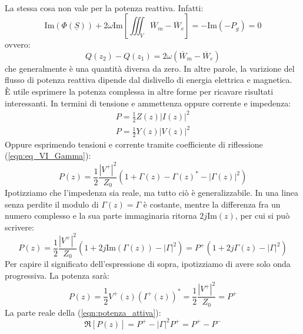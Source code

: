 \documentclass{book}
\begin{document}
        \\ La stessa cosa non vale per la potenza reattiva. Infatti:
        \begin{equation}
            \textrm{Im}(\Phi(\underline{S})) +2 \omega \textrm{Im}[\iiint_{V} \overline{W}_{m}-\overline{W}_{e}] = - \textrm{Im}(-P_{g}) = 0
        \end{equation}
        ovvero:
        \begin{equation}
            Q(z_{2})-Q(z_{1})=2 \omega (\overline{W}_{m}-\overline{W}_{e})
        \end{equation}
        che generalmente è una quantità diversa da zero. In altre parole, la varizione del flusso di potenza reattiva
        dipende dal dislivello di energia elettrica e magnetica.
        \\ 
        È utile esprimere la potenza complessa in altre forme per ricavare risultati interessanti. In termini 
        di tensione e ammettenza oppure corrente e impedenza:
        \begin{align}
            P = \frac{1}{2}Z(z)|I(z)|^{2} \\
            P= \frac{1}{2}Y(z)|V(z)|^{2}
        \end{align}
        Oppure esprimendo tensioni e corrente tramite coefficiente di riflessione (\ref{eqn:eq_VI_Gamma}):
        \begin{equation}
            P(z)=\frac{1}{2}\frac{|V^{+}|^{2}}{Z_{0}} (1+\Gamma(z)-\Gamma(z)^{*}-|\Gamma(z)|^{2})
        \end{equation}
        Ipotizziamo che l'impedenza sia reale, ma tutto ciò è generalizzabile. In una linea senza perdite il modulo di $\Gamma(z) = \Gamma$ è costante, mentre la differenza fra un numero complesso e 
        la sua parte immaginaria ritorna $2j\textrm{Im}(z)$, per cui si può scrivere:
        \begin{equation}
            \label{eqn:potenza_attiva}
            P(z)=\frac{1}{2}\frac{|V^{+}|^{2}}{Z_{0}}(1+2j\textrm{Im}(\Gamma(z))-|\Gamma|^{2}) =
            P^{+}(1+2j\Gamma (z)-|\Gamma|^{2})
        \end{equation}
        Per capire il significato dell'espressione di sopra, ipotizziamo di avere solo onda progressiva. La potenza
        sarà:
        \begin{equation}
            P(z)= \frac{1}{2}V^{+}(z)(I^{+}(z))^{*} = \frac{1}{2}\frac{|V^{+}|^{2}}{Z_{0}}=P^{+}
        \end{equation}
        La parte reale della (\ref{eqn:potenza_attiva}):
        \begin{equation} 
            \label{eqn:mi_serve4}
            \Re[P(z)]=P^{+}-|\Gamma|^{2}P^{+} = P^{+}-P^{-}
        \end{equation}
\end{document}

